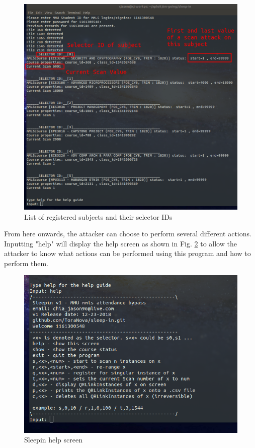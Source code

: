 \documentclass[runningheads]{llncs}
\begin{document}
\begin{figure}
\includegraphics[width=\textwidth]{imgres/sleepin_show.png}
\caption{List of registered subjects and their selector IDs} 
\label{fig:sleepin_show}
\end{figure}

From here onwards, the attacker can choose to perform several different actions. Inputting "help" will display the help screen as shown in Fig. \ref{fig:sleepin_help} to allow the attacker to know what actions can be performed using this program and how to perform them.

\begin{figure}
\includegraphics[width=\textwidth]{imgres/sleepin_help.png}
\caption{Sleepin help screen} 
\label{fig:sleepin_help}
\end{figure}
\end{document}
